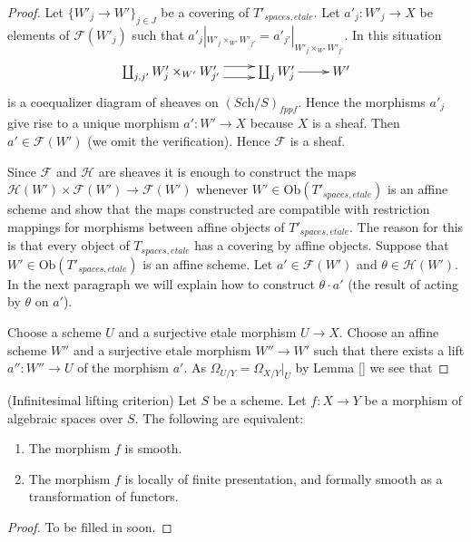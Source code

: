 \begin{proof}
Let $\{W'_j \to W'\}_{j \in J}$ be a covering of $T'_{spaces, etale}$.
Let $a'_j : W'_j \to X$ be elements of $\mathcal{F}(W'_j)$ such that
$a'_j|_{W'_j \times_{W'} W'_{j'}} = a'_{j'}|_{W'_j \times_{W'} W'_{j'}}$.
In this situation
$$
\xymatrix{
\coprod_{j, j'} W'_j \times_{W'} W'_{j'}
\ar@<1ex>[r]  \ar@<-1ex>[r] &
\coprod_j W'_j \ar[r] &
W'
}
$$
is a coequalizer diagram of sheaves on $(\textit{Sch}/S)_{fppf}$.
Hence the morphisms $a'_j$ give rise to a unique morphism $a' : W' \to X$
because $X$ is a sheaf. Then $a' \in \mathcal{F}(W')$ (we omit the
verification). Hence $\mathcal{F}$ is a sheaf.

\medskip\noindent
Since $\mathcal{F}$ and $\mathcal{H}$ are sheaves it is enough to construct
the maps $\mathcal{H}(W') \times \mathcal{F}(W') \to \mathcal{F}(W')$
whenever $W' \in \text{Ob}(T'_{spaces, etale})$ is an affine scheme and
show that the maps constructed are compatible with restriction mappings for
morphisms between affine objects of $T'_{spaces, etale}$. The reason for this
is that every object of $T_{spaces, etale}$ has a covering by affine objects.
Suppose that $W' \in \text{Ob}(T'_{spaces, etale})$ is an affine scheme.
Let $a' \in \mathcal{F}(W')$ and $\theta \in \mathcal{H}(W')$.
In the next paragraph we will explain how to construct $\theta \cdot a'$
(the result of acting by $\theta$ on $a'$).

\medskip\noindent
Choose a scheme $U$ and a surjective etale morphism $U \to X$.
Choose an affine scheme $W''$ and a surjective etale morphism
$W'' \to W'$ such that there exists a lift $a'' : W'' \to U$ of the
morphism $a'$. As $\Omega_{U/Y} = \Omega_{X/Y}|_U$ by
Lemma \ref{}
we see that 


\end{proof}





\begin{lemma}
\label{lemma-smooth-formally-smooth}
(Infinitesimal lifting criterion)
Let $S$ be a scheme.
Let $f : X \to Y$ be a morphism of algebraic spaces over $S$.
The following are equivalent:
\begin{enumerate}
\item The morphism $f$ is smooth.
\item The morphism $f$ is locally of finite presentation, and
formally smooth as a transformation of functors.
\end{enumerate}
\end{lemma}

\begin{proof}
To be filled in soon.
\end{proof}















